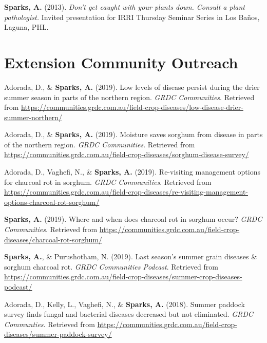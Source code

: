 \documentclass[11pt, a4paper]{awesome-cv}
\begin{document}
\begingroup
\setlength{\parindent}{-0.5in}
\setlength{\leftskip}{0.5in}

\textbf{Sparks, A.} (2013). \emph{Don't get caught with your plants down. Consult a plant pathologist.} Invited presentation for IRRI Thursday Seminar Series in Los Baños, Laguna, PHL.

\endgroup

\hypertarget{extension-community-outreach}{%
\section{Extension Community Outreach}\label{extension-community-outreach}}

\begingroup
\setlength{\parindent}{-0.5in}
\setlength{\leftskip}{0.5in}

\hypertarget{refs_extension}{}
\leavevmode\hypertarget{ref-Adorada2019a}{}%
Adorada, D., \& \textbf{Sparks, A.} (2019). Low levels of disease persist during the drier summer season in parts of the northern region. \emph{GRDC Communities}. Retrieved from \url{https://communities.grdc.com.au/field-crop-diseases/low-disease-drier-summer-northern/}

\leavevmode\hypertarget{ref-Adorada2019b}{}%
Adorada, D., \& \textbf{Sparks, A.} (2019). Moisture saves sorghum from disease in parts of the northern region. \emph{GRDC Communities}. Retrieved from \url{https://communities.grdc.com.au/field-crop-diseases/sorghum-disease-survey/}

\leavevmode\hypertarget{ref-Adorada2019c}{}%
Adorada, D., Vaghefi, N., \& \textbf{Sparks, A.} (2019). Re-visiting management options for charcoal rot in sorghum. \emph{GRDC Communities}. Retrieved from \url{https://communities.grdc.com.au/field-crop-diseases/re-visiting-management-options-charcoal-rot-sorghum/}

\leavevmode\hypertarget{ref-Sparks2019a}{}%
\textbf{Sparks, A.} (2019). Where and when does charcoal rot in sorghum occur? \emph{GRDC Communities}. Retrieved from \url{https://communities.grdc.com.au/field-crop-diseases/charcoal-rot-sorghum/}

\leavevmode\hypertarget{ref-Sparks2019b}{}%
\textbf{Sparks, A.}, \& Purushotham, N. (2019). Last season's summer grain diseases \& sorghum charcoal rot. \emph{GRDC Communities Podcast}. Retrieved from \url{https://communities.grdc.com.au/field-crop-diseases/summer-crop-diseases-podcast/}

\leavevmode\hypertarget{ref-Adorada2019d}{}%
Adorada, D., Kelly, L., Vaghefi, N., \& \textbf{Sparks, A.} (2018). Summer paddock survey finds fungal and bacterial diseases decreased but not eliminated. \emph{GRDC Communties}. Retrieved from \url{https://communities.grdc.com.au/field-crop-diseases/summer-paddock-survey/}
\end{document}
